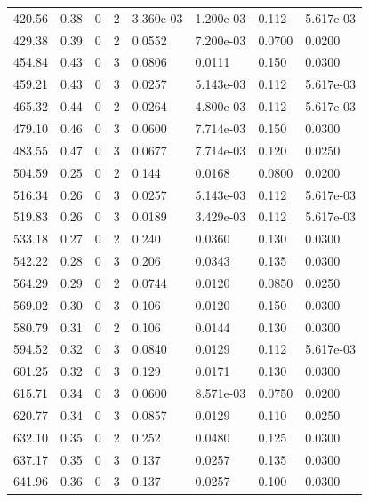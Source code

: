 \documentclass[preview]{standalone}
\begin{document}
{{{\begin{tabular}{L{1.2cm}C{1.2cm} C{0.3cm}C{0.5cm} C{1.4cm}C{1.4cm} C{1.4cm}C{1.4cm}}
  420.56  &  0.38  & 0     &  2 &  3.360e-03  & 1.200e-03  & 0.112 &  5.617e-03   \\ 
  429.38  &  0.39  & 0     &  2 &  0.0552  & 7.200e-03  & 0.0700 &  0.0200   \\ 
  454.84  &  0.43  & 0     &  3 &  0.0806  & 0.0111  & 0.150 &  0.0300   \\ 
  459.21  &  0.43  & 0     &  3 &  0.0257  & 5.143e-03  & 0.112 &  5.617e-03   \\ 
  465.32  &  0.44  & 0     &  2 &  0.0264  & 4.800e-03  & 0.112 &  5.617e-03   \\ 
  479.10  &  0.46  & 0     &  3 &  0.0600  & 7.714e-03  & 0.150 &  0.0300   \\ 
  483.55  &  0.47  & 0     &  3 &  0.0677  & 7.714e-03  & 0.120 &  0.0250   \\ 
  504.59  &  0.25  & 0     &  2 &  0.144  & 0.0168  & 0.0800 &  0.0200   \\ 
  516.34  &  0.26  & 0     &  3 &  0.0257  & 5.143e-03  & 0.112 &  5.617e-03   \\ 
  519.83  &  0.26  & 0     &  3 &  0.0189  & 3.429e-03  & 0.112 &  5.617e-03   \\ 
  533.18  &  0.27  & 0     &  2 &  0.240  & 0.0360  & 0.130 &  0.0300   \\ 
  542.22  &  0.28  & 0     &  3 &  0.206  & 0.0343  & 0.135 &  0.0300   \\ 
  564.29  &  0.29  & 0     &  2 &  0.0744  & 0.0120  & 0.0850 &  0.0250   \\ 
  569.02  &  0.30  & 0     &  3 &  0.106  & 0.0120  & 0.150 &  0.0300   \\ 
  580.79  &  0.31  & 0     &  2 &  0.106  & 0.0144  & 0.130 &  0.0300   \\ 
  594.52  &  0.32  & 0     &  3 &  0.0840  & 0.0129  & 0.112 &  5.617e-03   \\ 
  601.25  &  0.32  & 0     &  3 &  0.129  & 0.0171  & 0.130 &  0.0300   \\ 
  615.71  &  0.34  & 0     &  3 &  0.0600  & 8.571e-03  & 0.0750 &  0.0200   \\ 
  620.77  &  0.34  & 0     &  3 &  0.0857  & 0.0129  & 0.110 &  0.0250   \\ 
  632.10  &  0.35  & 0     &  2 &  0.252  & 0.0480  & 0.125 &  0.0300   \\ 
  637.17  &  0.35  & 0     &  3 &  0.137  & 0.0257  & 0.135 &  0.0300   \\ 
  641.96  &  0.36  & 0     &  3 &  0.137  & 0.0257  & 0.100 &  0.0300   \\ 

\end{tabular}}}}
\end{document}
